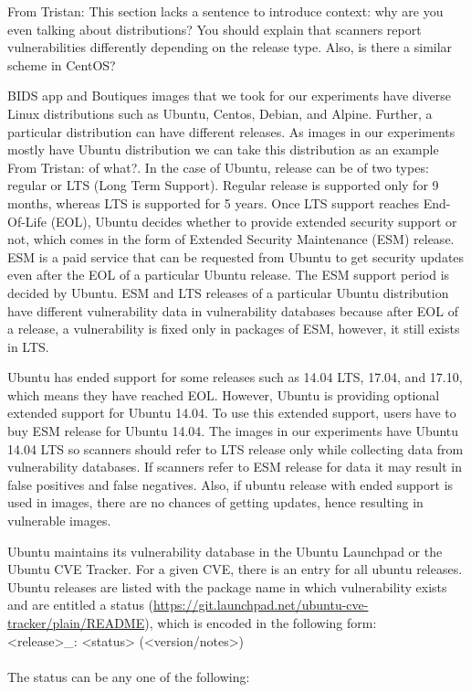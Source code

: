 \documentclass[a4paper,num-refs]{oup-contemporary}
\newcommand{\tristan}[1]{\color{blue}From Tristan: #1\color{black}}
\begin{document}
\tristan{This section lacks a sentence to introduce context: why are you even talking about distributions? 
You should explain that scanners report vulnerabilities differently depending on the release type. 
Also, is there a similar scheme in CentOS? }

BIDS app and Boutiques images that we took for our experiments have diverse Linux
distributions such as Ubuntu, Centos, Debian, and Alpine. Further, a particular
distribution can have different releases. As images in our experiments mostly have
Ubuntu distribution we can take this distribution as an example \tristan{of what?}. In the case of Ubuntu, release
can be of two types: regular or LTS (Long Term Support).
Regular release is supported only for 9 months, whereas LTS is supported for 5 years. Once LTS support
reaches End-Of-Life (EOL), Ubuntu decides whether to provide extended security support or not, which comes
in the form of Extended Security Maintenance (ESM) release.
ESM is a paid service that can be requested from Ubuntu to get security 
updates even after the EOL of a particular Ubuntu release. The ESM support period is decided by
Ubuntu. ESM and LTS releases of a particular Ubuntu distribution have different vulnerability
data in vulnerability databases because after EOL of a release, a vulnerability is fixed only in packages of ESM, however, it still
exists in LTS.

Ubuntu has ended support for some releases such as 14.04 LTS,
17.04, and 17.10, which means they have reached EOL. However, Ubuntu is providing optional extended support for Ubuntu 14.04.
To use this extended support, users have to buy ESM release for Ubuntu 14.04.
The images in our experiments have Ubuntu 14.04 LTS so scanners should refer
to LTS release only while collecting data from vulnerability databases. If scanners refer to ESM release for data it may result
in false positives and false negatives.
Also, if ubuntu release with ended support is used in images, there are no chances of getting updates, hence
resulting in vulnerable images. 

Ubuntu maintains its vulnerability database in the Ubuntu Launchpad or the Ubuntu CVE Tracker. For a given CVE, there is an entry for all ubuntu releases.
Ubuntu releases are listed with the package name
in which vulnerability exists and are entitled a status
(\href{https://git.launchpad.net/ubuntu-cve-tracker/plain/README}{https://git.launchpad.net/ubuntu-cve-tracker/plain/README}), which is
encoded in the following form:
\newline \\
\noindent <release>\_<source-package>: <status> (<version/notes>) \\
\newline\\
The status can be any one of the following:
\end{document}
